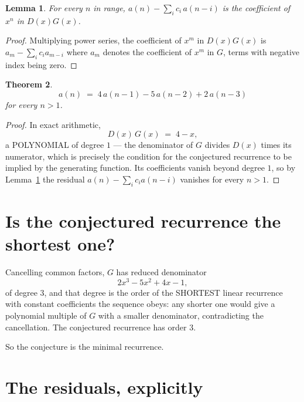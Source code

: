 \documentclass[11pt,a4paper]{article}
\theoremstyle{plain}
\newtheorem{theorem}{Theorem}
\newtheorem{lemma}[theorem]{Lemma}
\theoremstyle{definition}
\begin{document}
\begin{lemma}\label{lem:key}
For every $n$ in range, $a(n)-\sum_i c_i\,a(n-i)$ is the coefficient of $x^{n}$ in
$D(x)G(x)$.
\end{lemma}

\begin{proof}
Multiplying power series, the coefficient of $x^{m}$ in $D(x)G(x)$ is
$a_m-\sum_i c_i a_{m-i}$ where $a_m$ denotes the coefficient of $x^{m}$ in $G$, terms with
negative index being zero.
\end{proof}

\begin{theorem}
\[
a(n)\;=\;4\,a(n-1) - 5\,a(n-2) + 2\,a(n-3)
\]
for every $n>1$.
\end{theorem}

\begin{proof}
In exact arithmetic,
\[
D(x)\,G(x)\;=\;4 - x,
\]
a POLYNOMIAL of degree $1$ --- the denominator of $G$ divides $D(x)$ times its numerator,
which is precisely the condition for the conjectured recurrence to be implied by the
generating function. Its coefficients vanish beyond degree $1$, so by
Lemma~\ref{lem:key} the residual $a(n)-\sum_ic_ia(n-i)$ vanishes for every
$n>1$.
\end{proof}

\section{Is the conjectured recurrence the shortest one?}

Cancelling common factors, $G$ has reduced denominator
\[
2 x^{3} - 5 x^{2} + 4 x - 1,
\]
of degree $3$, and that degree is the order of the SHORTEST linear recurrence with
constant coefficients the sequence obeys: any shorter one would give a polynomial multiple of
$G$ with a smaller denominator, contradicting the cancellation. The conjectured recurrence has
order $3$.

So the conjecture is the minimal recurrence.

\section{The residuals, explicitly}
\end{document}
